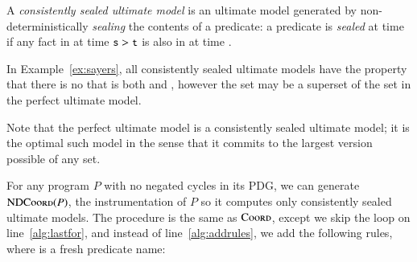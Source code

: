 \begin{definition}
A {\em consistently sealed ultimate model} is an ultimate model generated by non-deterministically {\em sealing} the contents of a predicate: a predicate  is {\em sealed} at time  if any fact in  at time $\dedalus{s} > \dedalus{t}$ is also in  at time .
\end{definition}

In Example~\ref{ex:sayers}, all consistently sealed ultimate models have the property that there is no  that is both  and , however the  set may be a superset of the  set in the perfect ultimate model.  

Note that the perfect ultimate model is a consistently sealed ultimate model; it is the optimal such model in the sense that it commits to the largest version possible of any set.



For any \lang program $P$ with no negated cycles in its PDG, we can generate $\textsc{NDCoord}(P)$, the instrumentation of $P$ so it computes only consistently sealed ultimate models.  The procedure is the same as $\textsc{Coord}$, except we skip the loop on line~\ref{alg:lastfor}, and instead of line~\ref{alg:addrules}, we add the following rules, where  is a fresh predicate name:

